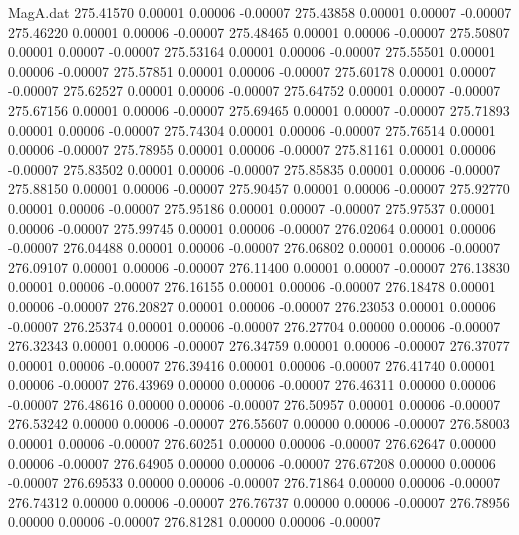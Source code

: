 \begin{filecontents}{MagA.dat}
 275.41570    0.00001    0.00006   -0.00007
 275.43858    0.00001    0.00007   -0.00007
 275.46220    0.00001    0.00006   -0.00007
 275.48465    0.00001    0.00006   -0.00007
 275.50807    0.00001    0.00007   -0.00007
 275.53164    0.00001    0.00006   -0.00007
 275.55501    0.00001    0.00006   -0.00007
 275.57851    0.00001    0.00006   -0.00007
 275.60178    0.00001    0.00007   -0.00007
 275.62527    0.00001    0.00006   -0.00007
 275.64752    0.00001    0.00007   -0.00007
 275.67156    0.00001    0.00006   -0.00007
 275.69465    0.00001    0.00007   -0.00007
 275.71893    0.00001    0.00006   -0.00007
 275.74304    0.00001    0.00006   -0.00007
 275.76514    0.00001    0.00006   -0.00007
 275.78955    0.00001    0.00006   -0.00007
 275.81161    0.00001    0.00006   -0.00007
 275.83502    0.00001    0.00006   -0.00007
 275.85835    0.00001    0.00006   -0.00007
 275.88150    0.00001    0.00006   -0.00007
 275.90457    0.00001    0.00006   -0.00007
 275.92770    0.00001    0.00006   -0.00007
 275.95186    0.00001    0.00007   -0.00007
 275.97537    0.00001    0.00006   -0.00007
 275.99745    0.00001    0.00006   -0.00007
 276.02064    0.00001    0.00006   -0.00007
 276.04488    0.00001    0.00006   -0.00007
 276.06802    0.00001    0.00006   -0.00007
 276.09107    0.00001    0.00006   -0.00007
 276.11400    0.00001    0.00007   -0.00007
 276.13830    0.00001    0.00006   -0.00007
 276.16155    0.00001    0.00006   -0.00007
 276.18478    0.00001    0.00006   -0.00007
 276.20827    0.00001    0.00006   -0.00007
 276.23053    0.00001    0.00006   -0.00007
 276.25374    0.00001    0.00006   -0.00007
 276.27704    0.00000    0.00006   -0.00007
 276.32343    0.00001    0.00006   -0.00007
 276.34759    0.00001    0.00006   -0.00007
 276.37077    0.00001    0.00006   -0.00007
 276.39416    0.00001    0.00006   -0.00007
 276.41740    0.00001    0.00006   -0.00007
 276.43969    0.00000    0.00006   -0.00007
 276.46311    0.00000    0.00006   -0.00007
 276.48616    0.00000    0.00006   -0.00007
 276.50957    0.00001    0.00006   -0.00007
 276.53242    0.00000    0.00006   -0.00007
 276.55607    0.00000    0.00006   -0.00007
 276.58003    0.00001    0.00006   -0.00007
 276.60251    0.00000    0.00006   -0.00007
 276.62647    0.00000    0.00006   -0.00007
 276.64905    0.00000    0.00006   -0.00007
 276.67208    0.00000    0.00006   -0.00007
 276.69533    0.00000    0.00006   -0.00007
 276.71864    0.00000    0.00006   -0.00007
 276.74312    0.00000    0.00006   -0.00007
 276.76737    0.00000    0.00006   -0.00007
 276.78956    0.00000    0.00006   -0.00007
 276.81281    0.00000    0.00006   -0.00007

\end{filecontents}
